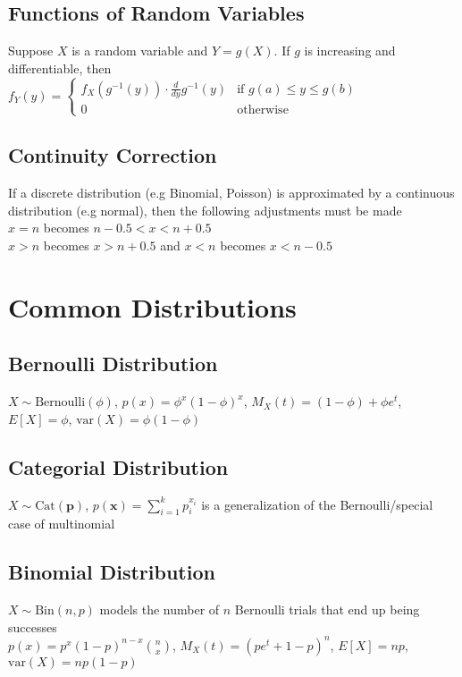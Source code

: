 \documentclass{article}
\newcommand{\V}{\mbox{var}}
\begin{document}
\subsection{Functions of Random Variables}
Suppose $X$ is a random variable and $Y=g(X)$. If $g$ is increasing and differentiable, then \\
$f_Y(y) = \begin{cases} f_X(g^{-1}(y)) \cdot \frac{d}{dy}g^{-1}(y) & \text{if } g(a) \leq y \leq g(b) \\ 
0 & \text{otherwise} \end{cases}$

\subsection{Continuity Correction}
If a discrete distribution (e.g Binomial, Poisson) is approximated by a continuous distribution (e.g normal), then the following adjustments must be made  \\
$x = n$ becomes $n-0.5 < x < n + 0.5$ \\
$x > n$ becomes $x > n + 0.5$ and $x < n $ becomes $x < n - 0.5$ 

\section{Common Distributions}
\subsection{Bernoulli Distribution}
$X\sim \mbox{Bernoulli}(\phi)$, $p(x) = \phi^x(1-\phi)^x$, $M_X(t) = (1-\phi) + \phi e^t$, $E[X] = \phi$, $\V(X) = \phi(1-\phi)$

\subsection{Categorial Distribution}
$X\sim \mbox{Cat}(\boldsymbol p)$, $p(\boldsymbol x) = \sum\limits_{i=1}^kp_i^{x_i}$ is a generalization of the Bernoulli/special case of multinomial

\subsection{Binomial Distribution}
$X\sim \mbox{Bin}(n, p)$ models the number of $n$ Bernoulli trials that end up being successes \\
$p(x) = p^x(1-p)^{n-x}\binom{n}{x}$, $M_X(t) = (pe^t + 1 - p)^n$, $E[X] = np$, $\V(X) = np(1-p)$
\end{document}
